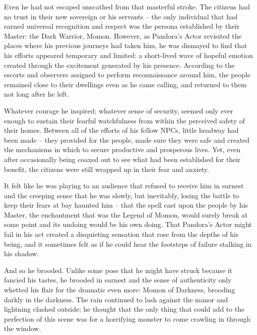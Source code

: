  

Even he had not escaped unscathed from that masterful stroke. The citizens had no trust in their new sovereign or his servants – the only individual that had earned universal recognition and respect was the persona established by their Master: the Dark Warrior, Momon. However, as Pandora’s Actor revisited the places where his previous journeys had taken him, he was dismayed to find that his efforts appeared temporary and limited: a short-lived wave of hopeful emotion created through the excitement generated by his presence. According to the escorts and observers assigned to perform reconnaissance around him, the people remained close to their dwellings even as he came calling, and returned to them not long after he left.

 

Whatever courage he inspired; whatever sense of security, seemed only ever enough to sustain their fearful watchfulness from within the perceived safety of their homes. Between all of the efforts of his fellow NPCs, little headway had been made – they provided for the people, made sure they were safe and created the mechanisms in which to secure productive and prosperous lives. Yet, even after occasionally being coaxed out to see what had been established for their benefit, the citizens were still wrapped up in their fear and anxiety.

 

It felt like he was playing to an audience that refused to receive him in earnest and the creeping sense that he was slowly, but inevitably, losing the battle to keep their fears at bay haunted him – that the spell cast upon the people by his Master, the enchantment that was the Legend of Momon, would surely break at some point and its undoing would be his own doing. That Pandora’s Actor might fail in his act created a disquieting sensation that rose from the depths of his being, and it sometimes felt as if he could hear the footsteps of failure stalking in his shadow.

 

And so he brooded. Unlike some pose that he might have struck because it fancied his tastes, he brooded in earnest and the sense of authenticity only whetted his flair for the dramatic even more: Momon of Darkness, brooding darkly in the darkness. The rain continued to lash against the manor and lightning clashed outside; he thought that the only thing that could add to the perfection of this scene was for a horrifying monster to come crawling in through the window.

